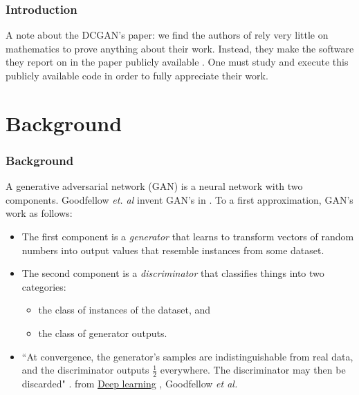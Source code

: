 \documentclass{beamer}
\begin{document}

\begin{frame}
\frametitle{Introduction}
A note about the DCGAN's paper: we find the authors of \cite{repLearnDcgan} rely
very little on mathematics to prove anything about their work.  Instead, they
make the software they report on in the paper publicly available \cite{dcganCode}.
One must study and execute this publicly available code in order to fully appreciate
their work.
\end{frame}



\section{Background} 
\begin{frame}
\frametitle{Background}
A generative adversarial network (GAN) is a neural network with two components. 
Goodfellow \textit{et. al} invent GAN's in \cite{gan}. To a first approximation,
GAN's work as follows:
\begin{itemize}
  \item The first component is a \textit{generator} that learns to transform vectors 
    of random numbers into output values that resemble instances from some dataset.  
  \item The second component is a \textit{discriminator} that classifies things into 
  two categories:
  \begin{itemize}
    \item the class of instances of the dataset, and
    \item the class of generator outputs.
  \end{itemize}
  \item ``At convergence, the generator’s samples are indistinguishable from real data,
     and the discriminator outputs $\frac{1}{2}$ everywhere. The discriminator may 
     then be discarded" \cite{deepLearnBookGenCh}. from \underline{Deep learning} , 
     Goodfellow \textit{et al.} 
\end{itemize}
\end{frame}
\end{document}
